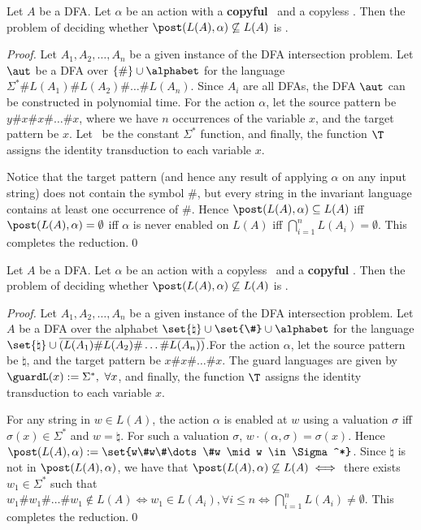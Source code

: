 \begin{lemma}
	Let $A$ be a DFA. Let $\alpha$ be an action with a \textbf{copyful} \spat\ and a copyless \tpat. Then the problem of deciding whether
	$\post(L(A), \alpha) \not\subseteq L(A)$ is \psph.
\end{lemma}
%
\begin{proof}
	Let $A_1, A_2, \dots, A_n$ be a given instance of the DFA intersection problem. Let $\aut$ be a DFA over  $\{\# \} \cup \alphabet$ for the
	language $\Sigma^*\#L(A_1)\#L(A_2)\#\dots\#L(A_n).$ Since $A_i$ are all DFAs, the DFA $\aut$ can be constructed in polynomial time. For
	the action $\alpha$, let the source pattern be $y\#x\#x\#\dots\#x$, where we have $n$ occurrences of the variable $x$, and the target
	pattern be $x$. Let \guardL\ be the constant $\Sigma^*$ function, and finally, the function $\T$ assigns the identity transduction to each
	variable $x$.
	\medskip

	Notice that the target pattern (and hence any result of applying $\alpha$ on any input string) does not contain the symbol \#, but every
	string in the invariant language contains at least one occurrence of \#. Hence $\post(L(A), \alpha) \subseteq L(A)$ iff
	$\post(L(A), \alpha) = \emptyset$ iff $\alpha$ is never enabled on $L(A)$ iff $\bigcap_{i=1}^n L(A_i) = \emptyset$. This completes the
	reduction.\qed
\end{proof}

\begin{lemma}
	Let $A$ be a DFA. Let $\alpha$ be an action with a copyless \spat\ and a \textbf{copyful} \tpat. Then the problem of deciding whether
	$\post(L(A), \alpha) \not\subseteq L(A)$ is \psph.
\end{lemma}
%
\begin{proof}
	Let $A_1, A_2, \dots, A_n$ be a given instance of the DFA intersection problem. Let $A$ be a DFA over the alphabet
	$\set{\natural} \cup \set{\#} \cup \alphabet$ for the language
	$\set{\natural} \cup \overline{\left(L(A_1)\#L(A_2)\#\dots\#L(A_n)\right)}$.For the action $\alpha$, let the source pattern be $\natural$,
	and the target pattern be $x\#x\#\dots\#x$. The guard languages are given by\\ $\guardL(x) := \Sigma^*,~ \forall x$, and finally, the function $\T$
	assigns the identity transduction to each variable $x$.
\medskip

	For any string in $w \in L(A)$, the action $\alpha$ is enabled at $w$ using a valuation $\sigma$ iff $\sigma(x)\in \Sigma^*$ and
	$w = \natural$. For such a valuation $\sigma$, $w \cdot(\alpha,\sigma)=\sigma(x)$. Hence
	$\post(L(A), \alpha) := \set{w\#w\#\dots\#w \mid w \in \Sigma^*}$. Since $\natural$ is not in $\post(L(A), \alpha)$, we have that
	$\post(L(A), \alpha) \not\subseteq L(A) \iff$ there exists $w_1 \in \Sigma^*$ such that
	$w_1\#w_1\#\dots\#w_1 \not\in L(A) \iff w_1 \in L(A_i),\forall i\leq n \iff \bigcap_{i=1}^nL(A_i) \neq \emptyset$. This completes the
	reduction.\qed
\end{proof}
